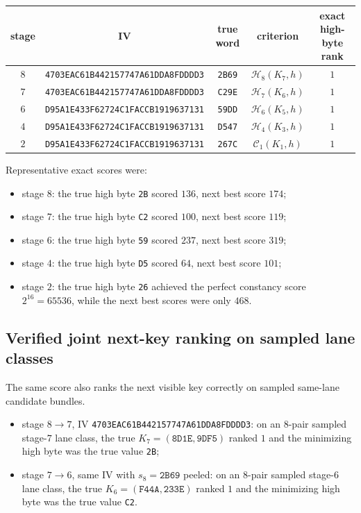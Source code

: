 \documentclass[11pt]{article}
\begin{document}
\begin{center}
\begin{tabular}{ccccc}
\toprule
stage & IV & true word & criterion & exact high-byte rank \\
\midrule
$8$ & \texttt{4703EAC61B442157747A61DDA8FDDDD3} & \texttt{2B69} & $\mathcal{H}_8(K_7,h)$ & $1$ \\
$7$ & \texttt{4703EAC61B442157747A61DDA8FDDDD3} & \texttt{C29E} & $\mathcal{H}_7(K_6,h)$ & $1$ \\
$6$ & \texttt{D95A1E433F62724C1FACCB1919637131} & \texttt{59DD} & $\mathcal{H}_6(K_5,h)$ & $1$ \\
$4$ & \texttt{D95A1E433F62724C1FACCB1919637131} & \texttt{D547} & $\mathcal{H}_4(K_3,h)$ & $1$ \\
$2$ & \texttt{D95A1E433F62724C1FACCB1919637131} & \texttt{267C} & $\mathcal{C}_1(K_1,h)$ & $1$ \\
\bottomrule
\end{tabular}
\end{center}

Representative exact scores were:
\begin{itemize}
\item stage $8$: the true high byte \texttt{2B} scored $136$, next best score $174$;
\item stage $7$: the true high byte \texttt{C2} scored $100$, next best score $119$;
\item stage $6$: the true high byte \texttt{59} scored $237$, next best score $319$;
\item stage $4$: the true high byte \texttt{D5} scored $64$, next best score $101$;
\item stage $2$: the true high byte \texttt{26} achieved the perfect constancy score $2^{16}=65536$, while the next best scores were only $468$.
\end{itemize}

\subsection*{Verified joint next-key ranking on sampled lane classes}
The same score also ranks the next visible key correctly on sampled same-lane candidate bundles.

\begin{itemize}
\item stage $8 \rightarrow 7$, IV \texttt{4703EAC61B442157747A61DDA8FDDDD3}: on an $8$-pair sampled stage-$7$ lane class, the true $K_7=(\texttt{8D1E},\texttt{9DF5})$ ranked $1$ and the minimizing high byte was the true value \texttt{2B};
\item stage $7 \rightarrow 6$, same IV with $s_8=\texttt{2B69}$ peeled: on an $8$-pair sampled stage-$6$ lane class, the true $K_6=(\texttt{F44A},\texttt{233E})$ ranked $1$ and the minimizing high byte was the true value \texttt{C2}.
\end{itemize}
\end{document}
